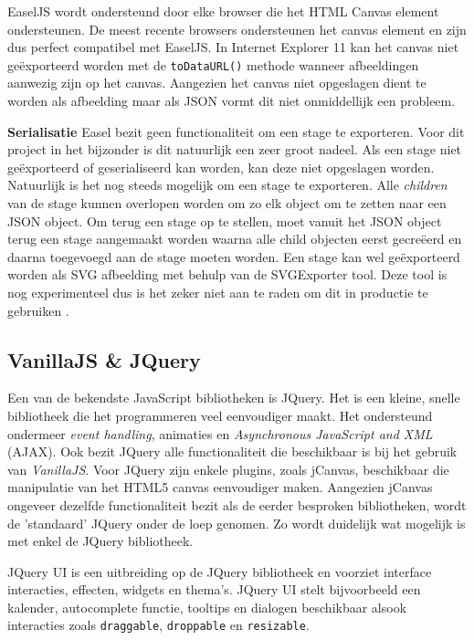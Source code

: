EaselJS wordt ondersteund door elke browser die het HTML Canvas element ondersteunen. De meest recente browsers ondersteunen het canvas element en zijn dus perfect compatibel met EaselJS. In Internet Explorer 11 kan het canvas niet ge\"{e}xporteerd worden met de \lstinline{toDataURL()} methode wanneer afbeeldingen aanwezig zijn op het canvas. Aangezien het canvas niet opgeslagen dient te worden als afbeelding maar als JSON vormt dit niet onmiddellijk een probleem.

\newpage
\textbf{Serialisatie} \break
Easel bezit geen functionaliteit om een stage te exporteren. Voor dit project in het bijzonder is dit natuurlijk een zeer groot nadeel. Als een stage niet ge\"{e}xporteerd of geserialiseerd kan worden, kan deze niet opgeslagen worden. Natuurlijk is het nog steeds mogelijk om een stage te exporteren. Alle \textit{children} van de stage kunnen overlopen worden om zo elk object om te zetten naar een JSON object. Om terug een stage op te stellen, moet vanuit het JSON object terug een stage aangemaakt worden waarna alle child objecten eerst gecre\"{e}erd en daarna toegevoegd aan de stage moeten worden. Een stage kan wel ge\"{e}xporteerd worden als SVG afbeelding met behulp van de SVGExporter tool.  Deze tool is nog experimenteel dus is het zeker niet aan te raden om dit in productie te gebruiken \cite{SVGExporter}. 

\subsection{VanillaJS \& JQuery}
Een van de bekendste JavaScript bibliotheken is JQuery. Het is een kleine, snelle bibliotheek die het programmeren veel eenvoudiger maakt. Het ondersteund ondermeer \textit{event handling}, animaties en \textit{Asynchronous JavaScript and XML} (AJAX). Ook bezit JQuery alle functionaliteit die beschikbaar is bij het gebruik van \textit{VanillaJS}. Voor JQuery zijn enkele plugins, zoals jCanvas, beschikbaar die manipulatie van het HTML5 canvas eenvoudiger maken. %
Aangezien jCanvas ongeveer dezelfde functionaliteit bezit als de eerder besproken bibliotheken, wordt de 'standaard' JQuery onder de loep genomen. Zo wordt duidelijk wat mogelijk is met enkel de JQuery bibliotheek.

JQuery UI is een uitbreiding op de JQuery bibliotheek en voorziet interface interacties, effecten, widgets en thema's. JQuery UI stelt bijvoorbeeld een kalender, autocomplete functie, tooltips en dialogen beschikbaar alsook interacties zoals \lstinline{draggable}, \lstinline{droppable} en \lstinline{resizable}. 

